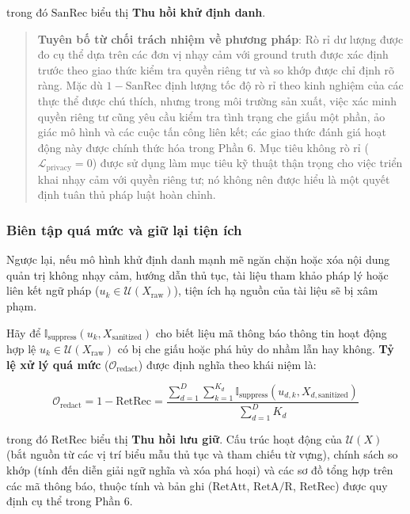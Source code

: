 \documentclass[
  11pt,
  a4paper,
]{article}
\begin{document}
trong đó \(\text{SanRec}\) biểu thị \textbf{Thu hồi khử định danh}.

\begin{quote}
\textbf{Tuyên bố từ chối trách nhiệm về phương pháp}: Rò rỉ dư lượng
được đo cụ thể dựa trên các đơn vị nhạy cảm với ground truth được xác
định trước theo giao thức kiểm tra quyền riêng tư và so khớp được chỉ
định rõ ràng. Mặc dù \(1 - \text{SanRec}\) định lượng tốc độ rò rỉ theo
kinh nghiệm của các thực thể được chú thích, nhưng trong môi trường sản
xuất, việc xác minh quyền riêng tư cũng yêu cầu kiểm tra tình trạng che
giấu một phần, ảo giác mô hình và các cuộc tấn công liên kết; các giao
thức đánh giá hoạt động này được chính thức hóa trong Phần 6. Mục tiêu
không rò rỉ (\(\mathcal{L}_{\text{privacy}} = 0\)) được sử dụng làm mục
tiêu kỹ thuật thận trọng cho việc triển khai nhạy cảm với quyền riêng
tư; nó không nên được hiểu là một quyết định tuân thủ pháp luật hoàn
chỉnh.
\end{quote}

\subsubsection{Biên tập quá mức và giữ lại tiện
ích}\label{biuxean-tux1eadp-quuxe1-mux1ee9c-vuxe0-giux1eef-lux1ea1i-tiux1ec7n-uxedch}

Ngược lại, nếu mô hình khử định danh mạnh mẽ ngăn chặn hoặc xóa nội dung
quản trị không nhạy cảm, hướng dẫn thủ tục, tài liệu tham khảo pháp lý
hoặc liên kết ngữ pháp (\(u_k \in \mathcal{U}(X_{\text{raw}})\)), tiện
ích hạ nguồn của tài liệu sẽ bị xâm phạm.

Hãy để \(\mathbb{I}_{\text{suppress}}(u_k, X_{\text{sanitized}})\) cho
biết liệu mã thông báo thông tin hoạt động hợp lệ
\(u_k \in \mathcal{U}(X_{\text{raw}})\) có bị che giấu hoặc phá hủy do
nhầm lẫn hay không. \textbf{Tỷ lệ xử lý quá mức}
(\(\mathcal{O}_{\text{redact}}\)) được định nghĩa theo khái niệm là:

\[\mathcal{O}_{\text{redact}} = 1 - \text{RetRec} = \frac{\sum_{d=1}^D \sum_{k=1}^{K_d} \mathbb{I}_{\text{suppress}}(u_{d,k}, X_{d,\text{sanitized}})}{\sum_{d=1}^D K_d}\]

trong đó \(\text{RetRec}\) biểu thị \textbf{Thu hồi lưu giữ}. Cấu trúc
hoạt động của \(\mathcal{U}(X)\) (bắt nguồn từ các vị trí biểu mẫu thủ
tục và tham chiếu từ vựng), chính sách so khớp (tính đến diễn giải ngữ
nghĩa và xóa phá hoại) và các sơ đồ tổng hợp trên các mã thông báo,
thuộc tính và bản ghi (\(\text{RetAtt}\), \(\text{RetA/R}\),
\(\text{RetRec}\)) được quy định cụ thể trong Phần 6.
\end{document}
